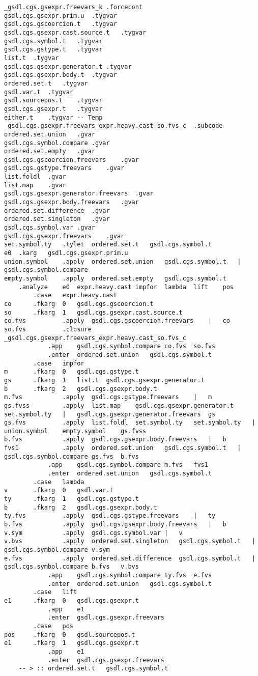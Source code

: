 \documentclass{report}
\begin{document}
\begin{verbatim}
_gsdl.cgs.gsexpr.freevars_k	.forcecont
gsdl.cgs.gsexpr.prim.u	.tygvar
gsdl.cgs.gscoercion.t	.tygvar
gsdl.cgs.gsexpr.cast.source.t	.tygvar
gsdl.cgs.symbol.t	.tygvar
gsdl.cgs.gstype.t	.tygvar
list.t	.tygvar
gsdl.cgs.gsexpr.generator.t	.tygvar
gsdl.cgs.gsexpr.body.t	.tygvar
ordered.set.t	.tygvar
gsdl.var.t	.tygvar
gsdl.sourcepos.t	.tygvar
gsdl.cgs.gsexpr.t	.tygvar
either.t	.tygvar	-- Temp
_gsdl.cgs.gsexpr.freevars_expr.heavy.cast_so.fvs_c	.subcode
ordered.set.union	.gvar
gsdl.cgs.symbol.compare	.gvar
ordered.set.empty	.gvar
gsdl.cgs.gscoercion.freevars	.gvar
gsdl.cgs.gstype.freevars	.gvar
list.foldl	.gvar
list.map	.gvar
gsdl.cgs.gsexpr.generator.freevars	.gvar
gsdl.cgs.gsexpr.body.freevars	.gvar
ordered.set.difference	.gvar
ordered.set.singleton	.gvar
gsdl.cgs.symbol.var	.gvar
gsdl.cgs.gsexpr.freevars	.gvar
set.symbol.ty	.tylet	ordered.set.t	gsdl.cgs.symbol.t
e0	.karg	gsdl.cgs.gsexpr.prim.u
union.symbol	.apply	ordered.set.union	gsdl.cgs.symbol.t	|	gsdl.cgs.symbol.compare
empty.symbol	.apply	ordered.set.empty	gsdl.cgs.symbol.t
	.analyze	e0	expr.heavy.cast	impfor	lambda	lift	pos
		.case	expr.heavy.cast
co		.fkarg	0	gsdl.cgs.gscoercion.t
so		.fkarg	1	gsdl.cgs.gsexpr.cast.source.t
co.fvs			.apply	gsdl.cgs.gscoercion.freevars	|	co
so.fvs			.closure	_gsdl.cgs.gsexpr.freevars_expr.heavy.cast_so.fvs_c
			.app	gsdl.cgs.symbol.compare	co.fvs	so.fvs
			.enter	ordered.set.union	gsdl.cgs.symbol.t
		.case	impfor
m		.fkarg	0	gsdl.cgs.gstype.t
gs		.fkarg	1	list.t	gsdl.cgs.gsexpr.generator.t
b		.fkarg	2	gsdl.cgs.gsexpr.body.t
m.fvs			.apply	gsdl.cgs.gstype.freevars	|	m
gs.fvss			.apply	list.map	gsdl.cgs.gsexpr.generator.t	set.symbol.ty	|	gsdl.cgs.gsexpr.generator.freevars	gs
gs.fvs			.apply	list.foldl	set.symbol.ty	set.symbol.ty	|	union.symbol	empty.symbol	gs.fvss
b.fvs			.apply	gsdl.cgs.gsexpr.body.freevars	|	b
fvs1			.apply	ordered.set.union	gsdl.cgs.symbol.t	|	gsdl.cgs.symbol.compare	gs.fvs	b.fvs
			.app	gsdl.cgs.symbol.compare	m.fvs	fvs1
			.enter	ordered.set.union	gsdl.cgs.symbol.t
		.case	lambda
v		.fkarg	0	gsdl.var.t
ty		.fkarg	1	gsdl.cgs.gstype.t
b		.fkarg	2	gsdl.cgs.gsexpr.body.t
ty.fvs			.apply	gsdl.cgs.gstype.freevars	|	ty
b.fvs			.apply	gsdl.cgs.gsexpr.body.freevars	|	b
v.sym			.apply	gsdl.cgs.symbol.var	|	v
v.bvs			.apply	ordered.set.singleton	gsdl.cgs.symbol.t	|	gsdl.cgs.symbol.compare	v.sym
e.fvs			.apply	ordered.set.difference	gsdl.cgs.symbol.t	|	gsdl.cgs.symbol.compare	b.fvs	v.bvs
			.app	gsdl.cgs.symbol.compare	ty.fvs	e.fvs
			.enter	ordered.set.union	gsdl.cgs.symbol.t
		.case	lift
e1		.fkarg	0	gsdl.cgs.gsexpr.t
			.app	e1
			.enter	gsdl.cgs.gsexpr.freevars
		.case	pos
pos		.fkarg	0	gsdl.sourcepos.t
e1		.fkarg	1	gsdl.cgs.gsexpr.t
			.app	e1
			.enter	gsdl.cgs.gsexpr.freevars
	-- > :: ordered.set.t	gsdl.cgs.symbol.t


\end{verbatim}
\end{document}
